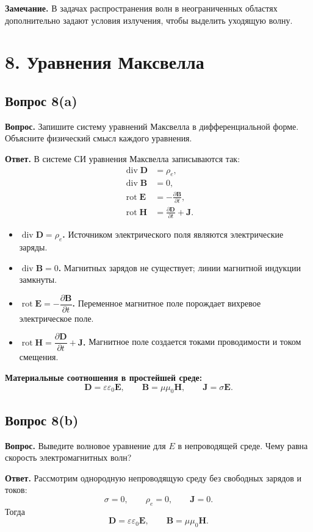 \documentclass[a4paper,12pt]{article}
\newcommand{\diver}{\operatorname{div}}
\newcommand{\rot}{\operatorname{rot}}
\newcommand{\Question}[2]{\subsection*{Вопрос #1}\textbf{Вопрос.} #2}
\newcommand{\Answer}{\textbf{Ответ.}}
\begin{document}
\textbf{Замечание.} В задачах распространения волн в неограниченных областях дополнительно задают условия излучения, чтобы выделить уходящую волну.

\section*{8. Уравнения Максвелла}

\Question{8(a)}{Запишите систему уравнений Максвелла в дифференциальной форме. Объясните физический смысл каждого уравнения.}

\Answer
В системе СИ уравнения Максвелла записываются так:
\begin{align*}
\diver \mathbf{D} &= \rho_e, \\
\diver \mathbf{B} &= 0, \\
\rot \mathbf{E} &= -\frac{\partial \mathbf{B}}{\partial t}, \\
\rot \mathbf{H} &= \frac{\partial \mathbf{D}}{\partial t}+\mathbf{J}.
\end{align*}

\begin{itemize}
  \item \textbf{$\diver\mathbf{D}=\rho_e$.} Источником электрического поля являются электрические заряды.
  \item \textbf{$\diver\mathbf{B}=0$.} Магнитных зарядов не существует; линии магнитной индукции замкнуты.
  \item \textbf{$\rot\mathbf{E}=-\dfrac{\partial\mathbf{B}}{\partial t}$.} Переменное магнитное поле порождает вихревое электрическое поле.
  \item \textbf{$\rot\mathbf{H}=\dfrac{\partial\mathbf{D}}{\partial t}+\mathbf{J}$.} Магнитное поле создается токами проводимости и током смещения.
\end{itemize}

\textbf{Материальные соотношения в простейшей среде:}
\[
\mathbf{D}=\varepsilon\varepsilon_0\mathbf{E}, \qquad
\mathbf{B}=\mu\mu_0\mathbf{H}, \qquad
\mathbf{J}=\sigma\mathbf{E}.
\]

\Question{8(b)}{Выведите волновое уравнение для $E$ в непроводящей среде. Чему равна скорость электромагнитных волн?}

\Answer
Рассмотрим однородную непроводящую среду без свободных зарядов и токов:
\[
\sigma=0, \qquad \rho_e=0, \qquad \mathbf{J}=0.
\]
Тогда
\[
\mathbf{D}=\varepsilon\varepsilon_0\mathbf{E},
\qquad
\mathbf{B}=\mu\mu_0\mathbf{H}.
\]
\end{document}
